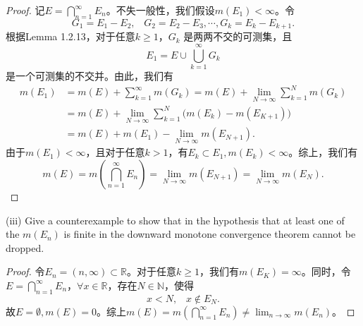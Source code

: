 \documentclass[reqno,a4paper,14pt]{amsart}
\begin{document}
\begin{proof}
    记$E=\bigcap_{n=1}^\infty E_n$。不失一般性，我们假设$m(E_1)<\infty$。令
    \begin{equation*}
        G_1=E_1-E_2,\;\;\; G_2=E_2-E_3, \cdots, G_k=E_k-E_{k+1}.
    \end{equation*}
    根据Lemma 1.2.13，对于任意$k\geq 1$，$G_k$ 是两两不交的可测集，且
    \begin{equation*}
        E_1=E\cup \bigcup_{k=1}^\infty G_k
    \end{equation*}
    是一个可测集的不交并。由此，我们有
    \begin{equation*}
        \begin{split}
            m(E_1)&=m(E)+\sum_{k=1}^\infty m(G_k)=m(E)+\lim_{N\to\infty} \sum_{k=1}^N m(G_k)\\
            &=m(E)+\lim_{N\to\infty}\sum_{k=1}^N\bigl(m(E_k)-m(E_{K+1})\bigr)\\
            &=m(E)+m(E_1)-\lim_{N\to\infty}m(E_{N+1}).
        \end{split}
    \end{equation*}
    由于$m(E_1)<\infty$，且对于任意$k>1$，有$E_k\subset E_1,m(E_k)<\infty$。综上，我们有
    \begin{equation*}
        m(E)=m(\bigcap_{n=1}^\infty E_n)=\lim_{N\to\infty}m(E_{N+1})=\lim_{N\to\infty}m(E_{N}).
    \end{equation*}
\end{proof}
(iii) Give a counterexample to show that in the hypothesis that at least one of the $m(E_n)$ is finite in the downward monotone convergence theorem cannot be dropped.
\begin{proof}
    令$E_n=(n,\infty)\subset \mathbb{R}$。对于任意$k\geq 1$，我们有$m(E_K)=\infty$。同时，令$E=\bigcap_{n=1}^\infty E_n$，$\forall x\in \mathbb{R}$，存在$N\in\mathbb{N}$，使得
    \begin{equation*}
        x<N,\;\;\; x\notin E_N.
    \end{equation*}
    故$E=\emptyset,m(E)=0$。综上$m(E)=m(\bigcap_{n=1}^\infty E_n)\neq \lim_{n\to\infty}m(E_n)$。
\end{proof}
\end{document}
